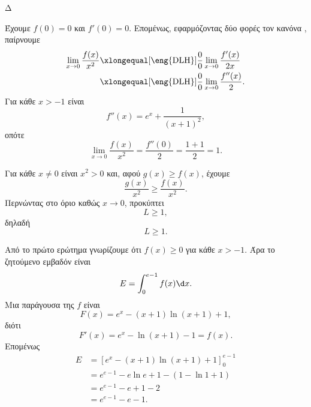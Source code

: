 \begin{thema}{Δ}
\begin{erwthma}
\item Έχουμε $f(0)=0$ και $f'(0)=0$. Επομένως, εφαρμόζοντας δύο φορές τον κανόνα , παίρνουμε
\begin{align*}
\lim_{x\to0}\frac{f(x)}{x^2}
&\xlongequal[\text{\eng{DLH}}]{\frac{0}{0}}
\lim_{x\to0}\frac{f'(x)}{2x}\\
&\xlongequal[\text{\eng{DLH}}]{\frac{0}{0}}
\lim_{x\to0}\frac{f''(x)}{2}.
\end{align*}
Για κάθε $x>-1$ είναι
\[
f''(x)=e^x+\frac{1}{(x+1)^2},
\]
οπότε
\[
{\lim_{x\to0}\frac{f(x)}{x^2}
=\frac{f''(0)}{2}
=\frac{1+1}{2}
=1}.
\]

Για κάθε $x\neq0$ είναι $x^2>0$ και, αφού $g(x)\geq f(x)$, έχουμε
\[
\frac{g(x)}{x^2}\geq\frac{f(x)}{x^2}.
\]
Περνώντας στο όριο καθώς $x\to0$, προκύπτει
\[
L\geq1,
\]
δηλαδή
\[
{L\geq1}.
\]

\item Από το πρώτο ερώτημα γνωρίζουμε ότι $f(x)\geq0$ για κάθε $x>-1$. Άρα το ζητούμενο εμβαδόν είναι
\[
E=\int_0^{e-1}f(x)\d x.
\]
Μια παράγουσα της $f$ είναι
\[
F(x)=e^x-(x+1)\ln(x+1)+1,
\]
διότι
\[
F'(x)=e^x-\ln(x+1)-1=f(x).
\]
Επομένως
\begin{align*}
E
&=\left[e^x-(x+1)\ln(x+1)+1\right]_0^{e-1}\\
&=e^{e-1}-e\ln e+1-\left(1-\ln1+1\right)\\
&=e^{e-1}-e+1-2\\
&={e^{e-1}-e-1}.
\end{align*}
\end{erwthma}
\end{thema}
